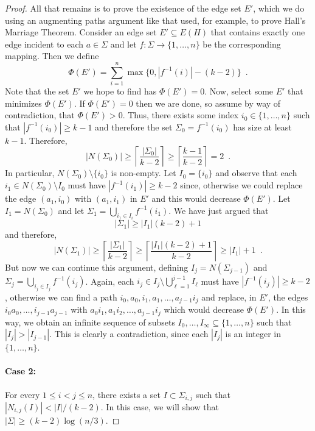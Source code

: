 \documentclass{patmorin}
\begin{document}
\begin{proof}
   All that remains is to prove the existence of the edge set $E'$, which
   we do using an augmenting paths argument like that used, for example,
   to prove Hall's Marriage Theorem.  Consider an edge set $E'\subseteq
   E(H)$ that contains exactly one edge incident to each $a\in\Sigma$
   and let $f:\Sigma\to\{1,\ldots,n\}$ be the corresponding mapping.
   Then we define
   \[
      \Phi(E') = \sum_{i=1}^n\max\{0, |f^{-1}(i)|-(k-2)\} \enspace .
   \]
   Note that the set $E'$ we hope to find has $\Phi(E')=0$.  Now, select
   some $E'$ that minimizes $\Phi(E')$.  If $\Phi(E')=0$ then we are done,
   so assume by way of contradiction, that $\Phi(E') > 0$.  Thus, there
   exists some index $i_0\in\{1,\ldots,n\}$ such that $|f^{-1}(i_0)|\ge k-1$
   and therefore the set $\Sigma_0=f^{-1}(i_0)$ has size at least $k-1$.
   Therefore, 
   \[
       |N(\Sigma_0)| \ge \left\lceil\frac{|\Sigma_0|}{k-2}\right\rceil \ge 
\left\lceil\frac{k-1}{k-2}\right\rceil = 2 \enspace .
   \]
   In particular, $N(\Sigma_0)\setminus\{i_0\}$ is non-empty.  Let
   $I_0=\{i_0\}$ and observe that each $i_1\in N(\Sigma_0)\setminus I_0$
   must have $|f^{-1}(i_1)|\ge k-2$ since, otherwise we could replace
   the edge $(a_1,i_0)$ with $(a_1,i_1)$ in $E'$ and this would decrease
   $\Phi(E')$.  Let $I_1=N(\Sigma_0)$ and let $\Sigma_1=\bigcup_{i_1\in
   I_i} f^{-1}(i_1)$.  We have just argued that
   \[
        |\Sigma_1|\ge |I_1|(k-2)+1
   \]
   and therefore, 
   \[
          |N(\Sigma_1)| \ge \left\lceil\frac{|\Sigma_1|}{k-2}\right\rceil
            \ge \left\lceil\frac{|I_1|(k-2)+1}{k-2}\right\rceil
            \ge |I_1|+1 \enspace .
   \]
   But now we can continue this argument, defining $I_j=N(\Sigma_{j-1})$
   and $\Sigma_j=\bigcup_{i_j\in I_j} f^{-1}(i_j)$.  Again,
   each $i_j\in I_j\setminus \bigcup_{\ell=1}^{j-1} I_\ell$
   must have $|f^{-1}(i_j)|\ge k-2$, otherwise we can find a path
   $i_0,a_0,i_1,a_1,\ldots,a_{j-1}i_j$ and replace, in $E'$, the edges
   $i_0a_0,\ldots,i_{j-1}a_{j-1}$ with $a_0i_1,a_1i_2,\ldots,a_{j-1}i_j$
   which would decrease $\Phi(E')$.  In this way, we obtain an infinite
   sequence of subsets $I_0,\ldots,I_\infty\subseteq \{1,\ldots,n\}$
   such that $|I_{j}|>|I_{j-1}|$.  This is clearly a contradiction,
   since each $|I_j|$ is an integer in $\{1,\ldots,n\}$.

   \paragraph{Case 2:}
   For every $1\le i< j\le n$, there exists a set $I\subset\Sigma_{i,j}$
   such that $|N_{i,j}(I)| < |I|/(k-2)$.  In this case, we will show
   that $|\Sigma|\ge (k-2)\log(n/3)$.


\end{proof}
\end{document}
